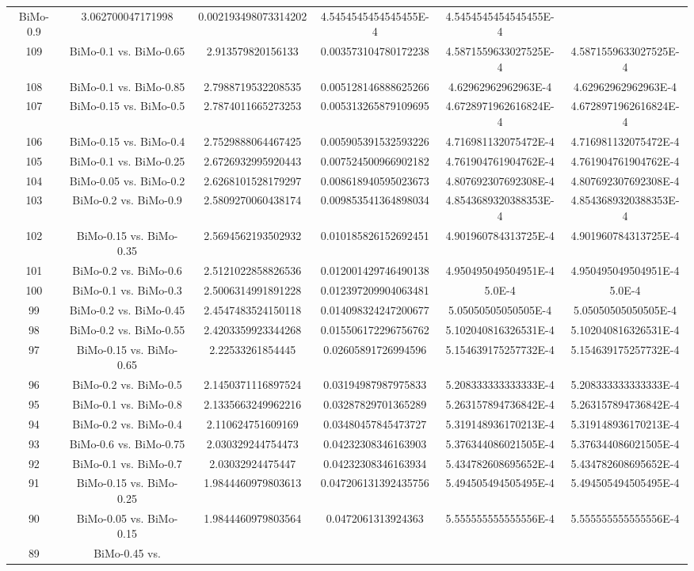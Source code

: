 \documentclass[a4paper,10pt]{article}
\begin{document}
\begin{landscape}
\begin{table}[!htp]
\begin{tabular}{cccccc}
BiMo-0.9&3.062700047171998&0.002193498073314202&4.5454545454545455E-4&4.5454545454545455E-4\\109&BiMo-0.1 vs. BiMo-0.65&2.913579820156133&0.003573104780172238&4.5871559633027525E-4&4.5871559633027525E-4\\108&BiMo-0.1 vs. BiMo-0.85&2.7988719532208535&0.005128146888625266&4.62962962962963E-4&4.62962962962963E-4\\107&BiMo-0.15 vs. BiMo-0.5&2.7874011665273253&0.005313265879109695&4.6728971962616824E-4&4.6728971962616824E-4\\106&BiMo-0.15 vs. BiMo-0.4&2.7529888064467425&0.005905391532593226&4.716981132075472E-4&4.716981132075472E-4\\105&BiMo-0.1 vs. BiMo-0.25&2.6726932995920443&0.007524500966902182&4.761904761904762E-4&4.761904761904762E-4\\104&BiMo-0.05 vs. BiMo-0.2&2.6268101528179297&0.008618940595023673&4.807692307692308E-4&4.807692307692308E-4\\103&BiMo-0.2 vs. BiMo-0.9&2.5809270060438174&0.009853541364898034&4.8543689320388353E-4&4.8543689320388353E-4\\102&BiMo-0.15 vs. BiMo-0.35&2.5694562193502932&0.010185826152692451&4.901960784313725E-4&4.901960784313725E-4\\101&BiMo-0.2 vs. BiMo-0.6&2.5121022858826536&0.012001429746490138&4.950495049504951E-4&4.950495049504951E-4\\100&BiMo-0.1 vs. BiMo-0.3&2.5006314991891228&0.012397209904063481&5.0E-4&5.0E-4\\99&BiMo-0.2 vs. BiMo-0.45&2.4547483524150118&0.014098324247200677&5.05050505050505E-4&5.05050505050505E-4\\98&BiMo-0.2 vs. BiMo-0.55&2.4203359923344268&0.015506172296756762&5.102040816326531E-4&5.102040816326531E-4\\97&BiMo-0.15 vs. BiMo-0.65&2.22533261854445&0.02605891726994596&5.154639175257732E-4&5.154639175257732E-4\\96&BiMo-0.2 vs. BiMo-0.5&2.1450371116897524&0.03194987987975833&5.208333333333333E-4&5.208333333333333E-4\\95&BiMo-0.1 vs. BiMo-0.8&2.1335663249962216&0.03287829701365289&5.263157894736842E-4&5.263157894736842E-4\\94&BiMo-0.2 vs. BiMo-0.4&2.110624751609169&0.03480457845473727&5.319148936170213E-4&5.319148936170213E-4\\93&BiMo-0.6 vs. BiMo-0.75&2.030329244754473&0.04232308346163903&5.376344086021505E-4&5.376344086021505E-4\\92&BiMo-0.1 vs. BiMo-0.7&2.03032924475447&0.04232308346163934&5.434782608695652E-4&5.434782608695652E-4\\91&BiMo-0.15 vs. BiMo-0.25&1.9844460979803613&0.047206131392435756&5.494505494505495E-4&5.494505494505495E-4\\90&BiMo-0.05 vs. BiMo-0.15&1.9844460979803564&0.0472061313924363&5.555555555555556E-4&5.555555555555556E-4\\89&BiMo-0.45 vs. 
\end{tabular}
\end{table}
\end{landscape}
\end{document}
